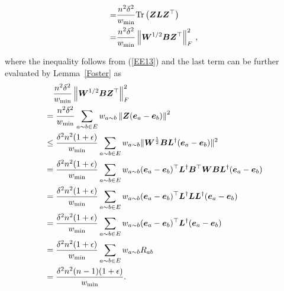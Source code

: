 \documentclass[10pt,journal,compsoc,twocolumn,twoside]{IEEEtran}
\begin{document}
\begin{IEEEproof}
\begin{small}
\begin{align*}
            =   & \frac{n^2\delta^2}{w_{\min}}  \mathrm{Tr}\left(\boldsymbol{Z}\boldsymbol{L}\boldsymbol{Z}^{\top}\right)                                         \\
            =   & \frac{n^2\delta^{2}}{w_{\min}} \left\Vert\boldsymbol{W}^{1/2} \boldsymbol{B} \boldsymbol{Z}^{\top}\right\Vert_{F}^{2}\,,
        \end{align*}
    \end{small}
    where the  inequality follows from (\ref{EE13}) and the last term can be further evaluated by Lemma~\ref {Foster} as
    \begin{align*}
         & \quad \frac{n^2\delta^2}{w_{\min}} \left\Vert\boldsymbol{W}^{1/2} \boldsymbol{B} \boldsymbol{Z}^{\top}\right\Vert_{F}^{2}                                            \\
         & =\frac{n^2\delta^{2}}{w_{\min}}
        \sum_{a\sim b \in E} w_{a\sim b} \left\Vert\boldsymbol{Z} (\boldsymbol{e}_{a} - \boldsymbol{e}_{b})\right\Vert^{2}                                                      \\
         & \leq
        \frac{\delta^{2}n^2 (1+\epsilon)}{w_{\min}}
        \sum_{a\sim b \in E} w_{a\sim b}\|\boldsymbol{W}^{\frac{1}{2}} \boldsymbol{B} \boldsymbol{L}^{\dagger} (\boldsymbol{e}_a-\boldsymbol{e}_b)\|^2                              \\
         & =
        \frac{\delta^{2}n^2 (1+\epsilon)}{w_{\min}}
        \sum_{a\sim b \in E} w_{a\sim b}(\boldsymbol{e}_a-\boldsymbol{e}_b)^\top \boldsymbol{L}^{\dagger} \boldsymbol{B}^\top \boldsymbol{W} \boldsymbol{B} \boldsymbol{L}^{\dagger} (\boldsymbol{e}_a-\boldsymbol{e}_b) \\
         & =
        \frac{\delta^{2}n^2 (1+\epsilon)}{w_{\min}}
        \sum_{a\sim b \in E} w_{a\sim b}(\boldsymbol{e}_a-\boldsymbol{e}_b)^\top \boldsymbol{L}^{\dagger} \boldsymbol{L} \boldsymbol{L}^{\dagger} (\boldsymbol{e}_a-\boldsymbol{e}_b)                   \\
         & =
        \frac{\delta^{2}n^2 (1+\epsilon)}{w_{\min}}
        \sum_{a\sim b \in E} w_{a\sim b}(\boldsymbol{e}_a-\boldsymbol{e}_b)^\top \boldsymbol{L}^{\dagger} (\boldsymbol{e}_a-\boldsymbol{e}_b)                                       \\
         & =
        \frac{\delta^{2} n^2 (1+\epsilon)}{w_{\min}}
        \sum_{a\sim b \in E} w_{a\sim b} R_{ab}                                                                                       \\
         & =\frac{\delta^{2} n^2(n-1) (1+\epsilon)}{w_{\min}}.
    \end{align*}


\end{IEEEproof}
\end{document}
